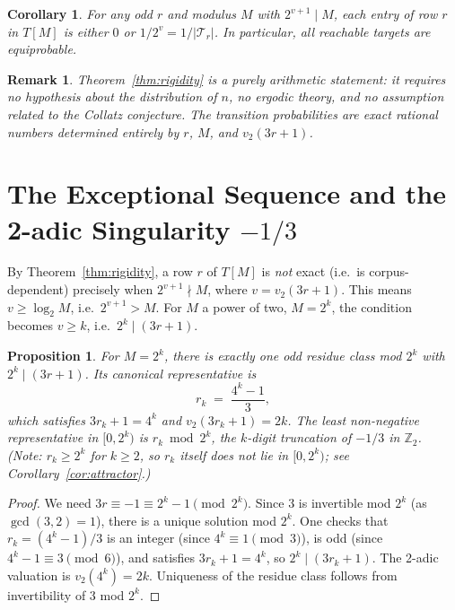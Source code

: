 \documentclass[12pt,a4paper]{article}
\newtheorem{corollary}[theorem]{Corollary}
\newtheorem{proposition}[theorem]{Proposition}
\newtheorem{remark}[theorem]{Remark}
\newcommand{\Ztwo}{\mathbb{Z}_2}
\begin{document}
\begin{corollary}
\label{cor:zero-one}
For any odd $r$ and modulus $M$ with $2^{v+1} \mid M$, each entry of row $r$
in $T[M]$ is either $0$ or $1/2^v = 1/|\mathcal{T}_r|$.  In particular,
\emph{all reachable targets are equiprobable}.
\end{corollary}

\begin{remark}
Theorem~\ref{thm:rigidity} is a purely arithmetic statement: it requires no
hypothesis about the distribution of $n$, no ergodic theory, and no assumption
related to the Collatz conjecture.  The transition probabilities are exact
rational numbers determined entirely by $r$, $M$, and $v_2(3r+1)$.
\end{remark}

\section{The Exceptional Sequence and the 2-adic Singularity $-1/3$}
\label{sec:exceptional}

By Theorem~\ref{thm:rigidity}, a row $r$ of $T[M]$ is \emph{not} exact
(i.e.\ is corpus-dependent) precisely when $2^{v+1} \nmid M$, where $v =
v_2(3r+1)$.  This means $v \geq \log_2 M$, i.e.\ $2^{v+1} > M$.  For $M$
a power of two, $M = 2^k$, the condition becomes $v \geq k$, i.e.\ $2^k \mid
(3r+1)$.

\begin{proposition}
\label{prop:exceptional}
For $M = 2^k$, there is exactly one odd residue class mod $2^k$ with
$2^k \mid (3r+1)$.  Its canonical representative is
\[
  r_k \;=\; \frac{4^k - 1}{3},
\]
which satisfies $3r_k + 1 = 4^k$ and $v_2(3r_k+1) = 2k$.  The least
non-negative representative in $[0, 2^k)$ is $r_k \bmod 2^k$, the $k$-digit
truncation of $-1/3$ in $\Ztwo$.  (Note: $r_k \geq 2^k$ for $k \geq 2$, so
$r_k$ itself does not lie in $[0,2^k)$; see Corollary~\ref{cor:attractor}.)
\end{proposition}

\begin{proof}
We need $3r \equiv -1 \equiv 2^k - 1 \pmod{2^k}$.  Since $3$ is invertible
mod $2^k$ (as $\gcd(3,2)=1$), there is a unique solution mod $2^k$.  One checks
that $r_k = (4^k-1)/3$ is an integer (since $4^k \equiv 1 \pmod 3$), is odd
(since $4^k - 1 \equiv 3 \pmod 6$), and satisfies $3r_k + 1 = 4^k$, so
$2^k \mid (3r_k+1)$.  The 2-adic valuation is $v_2(4^k) = 2k$.  Uniqueness
of the residue class follows from invertibility of $3$ mod $2^k$.
\end{proof}
\end{document}
